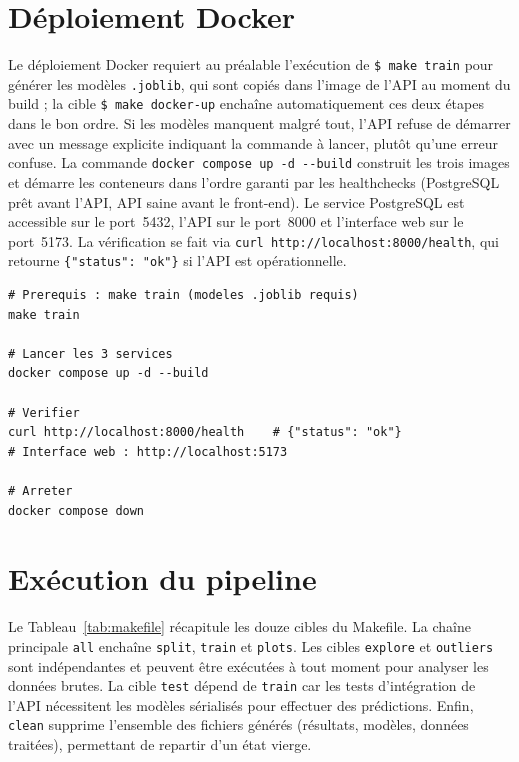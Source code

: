 \documentclass[12pt,a4paper,openany]{report}
\newcommand{\cmd}[1]{\texttt{\$ #1}}
\begin{document}
\section{Déploiement Docker}

Le déploiement Docker requiert au préalable l'exécution de \cmd{make train} pour générer les modèles \texttt{.joblib}, qui sont copiés dans l'image de l'API au moment du build ; la cible \cmd{make docker-up} enchaîne automatiquement ces deux étapes dans le bon ordre. Si les modèles manquent malgré tout, l'API refuse de démarrer avec un message explicite indiquant la commande à lancer, plutôt qu'une erreur confuse. La commande \texttt{docker compose up -d -{}-build} construit les trois images et démarre les conteneurs dans l'ordre garanti par les healthchecks (PostgreSQL prêt avant l'API, API saine avant le front-end). Le service PostgreSQL est accessible sur le port~5432, l'API sur le port~8000 et l'interface web sur le port~5173. La vérification se fait via \texttt{curl http://localhost:8000/health}, qui retourne \texttt{\{"status": "ok"\}} si l'API est opérationnelle.

\begin{lstlisting}[style=bash, caption={Déploiement avec Docker Compose}]
# Prerequis : make train (modeles .joblib requis)
make train

# Lancer les 3 services
docker compose up -d --build

# Verifier
curl http://localhost:8000/health    # {"status": "ok"}
# Interface web : http://localhost:5173

# Arreter
docker compose down
\end{lstlisting}

\section{Exécution du pipeline}

Le Tableau~\ref{tab:makefile} récapitule les douze cibles du Makefile. La chaîne principale \texttt{all} enchaîne \texttt{split}, \texttt{train} et \texttt{plots}. Les cibles \texttt{explore} et \texttt{outliers} sont indépendantes et peuvent être exécutées à tout moment pour analyser les données brutes. La cible \texttt{test} dépend de \texttt{train} car les tests d'intégration de l'API nécessitent les modèles sérialisés pour effectuer des prédictions. Enfin, \texttt{clean} supprime l'ensemble des fichiers générés (résultats, modèles, données traitées), permettant de repartir d'un état vierge.
\end{document}
